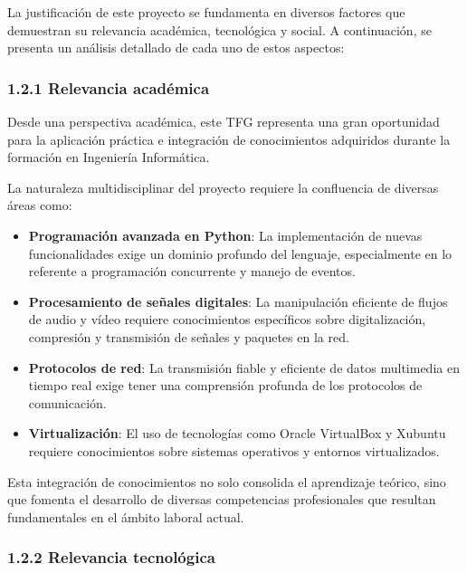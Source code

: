 La justificación de este proyecto se fundamenta en diversos factores que demuestran su relevancia académica, tecnológica y social. A continuación, se presenta un análisis detallado de cada uno de estos aspectos:

\subsubsection*{1.2.1 Relevancia académica}

Desde una perspectiva académica, este TFG representa una gran oportunidad para la aplicación práctica e integración de conocimientos adquiridos durante la formación en Ingeniería Informática. 

\vspace{\baselineskip}
La naturaleza multidisciplinar del proyecto requiere la confluencia de diversas áreas como:

\begin{itemize}
    \item \textbf{Programación avanzada en Python}: La implementación de nuevas funcionalidades exige un dominio profundo del lenguaje, especialmente en lo referente a programación concurrente y manejo de eventos.

    
    \item \textbf{Procesamiento de señales digitales}: La manipulación eficiente de flujos de audio y vídeo requiere conocimientos específicos sobre digitalización, compresión y transmisión de señales y paquetes en la red.
    
    \item \textbf{Protocolos de red}: La transmisión fiable y eficiente de datos multimedia en tiempo real exige tener una comprensión profunda de los protocolos de comunicación.
    
    \item \textbf{Virtualización}: El uso de tecnologías como Oracle VirtualBox y Xubuntu requiere conocimientos sobre sistemas operativos y entornos virtualizados.

\end{itemize}
\vspace{\baselineskip}
Esta integración de conocimientos no solo consolida el aprendizaje teórico, sino que fomenta el desarrollo de diversas competencias profesionales que resultan fundamentales en el ámbito laboral actual.

\subsubsection*{1.2.2 Relevancia tecnológica}

